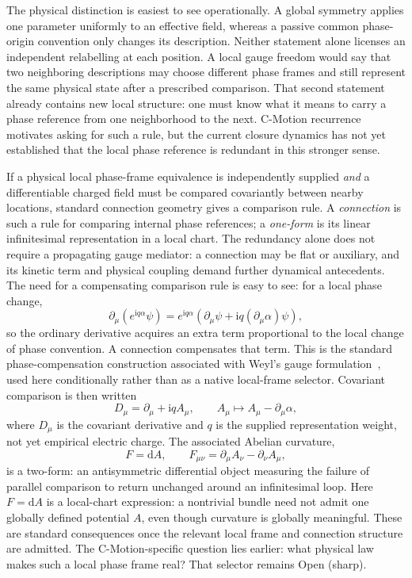 \documentclass[11pt]{article}
\theoremstyle{definition}
\newcommand{\dd}{\mathrm{d}}
\newcommand{\ii}{\mathrm{i}}
\begin{document}
The physical distinction is easiest to see operationally.  A global symmetry applies one parameter uniformly to an effective field, whereas a passive common phase-origin convention only changes its description.  Neither statement alone licenses an independent relabelling at each position.  A local gauge freedom would say that two neighboring descriptions may choose different phase frames and still represent the same physical state after a prescribed comparison.  That second statement already contains new local structure: one must know what it means to carry a phase reference from one neighborhood to the next.  C-Motion recurrence motivates asking for such a rule, but the current closure dynamics has not yet established that the local phase reference is redundant in this stronger sense.

If a physical local phase-frame equivalence is independently supplied \emph{and} a differentiable charged field must be compared covariantly between nearby locations, standard connection geometry gives a comparison rule.  A \emph{connection} is such a rule for comparing internal phase references; a \emph{one-form} is its linear infinitesimal representation in a local chart.  The redundancy alone does not require a propagating gauge mediator: a connection may be flat or auxiliary, and its kinetic term and physical coupling demand further dynamical antecedents.  The need for a compensating comparison rule is easy to see: for a local phase change,
\begin{equation}
 \partial_\mu(e^{\ii q\alpha}\psi)
 =e^{\ii q\alpha}\left(\partial_\mu\psi+\ii q(\partial_\mu\alpha)\psi\right),
 \label{eq:local_phase_derivative}
\end{equation}
so the ordinary derivative acquires an extra term proportional to the local change of phase convention.  A connection compensates that term.  This is the standard phase-compensation
construction associated with Weyl's gauge formulation~\cite{Weyl1929},
used here conditionally rather than as a native local-frame selector.
Covariant comparison is then written
\begin{equation}
 D_\mu=\partial_\mu+\ii qA_\mu,
 \qquad
 A_\mu\mapsto A_\mu-\partial_\mu\alpha,
 \label{eq:conditional_u1_connection}
\end{equation}
where $D_\mu$ is the covariant derivative and $q$ is the supplied representation weight, not yet empirical electric charge.  The associated Abelian curvature,
\begin{equation}
 F=\dd A,
 \qquad
 F_{\mu\nu}=\partial_\mu A_\nu-\partial_\nu A_\mu,
 \label{eq:abelian_curvature}
\end{equation}
is a two-form: an antisymmetric differential object measuring the failure of parallel comparison to return unchanged around an infinitesimal loop.  Here $F=\dd A$ is a local-chart expression: a nontrivial bundle need not admit one globally defined potential $A$, even though curvature is globally meaningful.  These are standard consequences once the relevant local frame and connection structure are admitted.  The C-Motion-specific question lies earlier: what physical law makes such a local phase frame real?  That selector remains Open (sharp).
\end{document}
